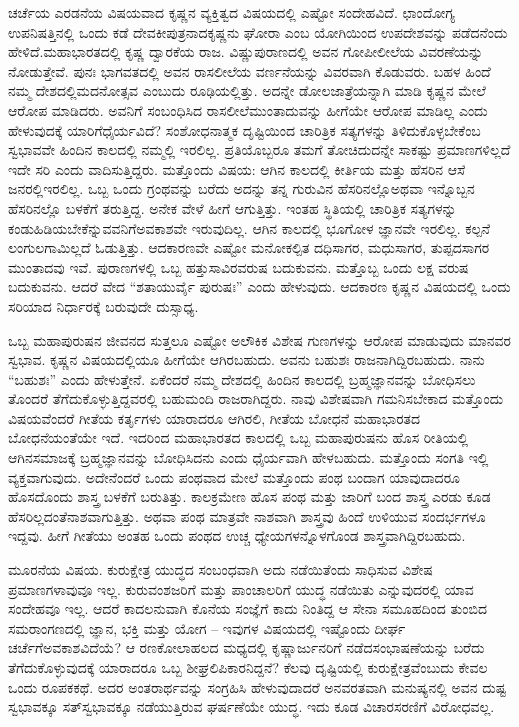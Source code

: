 ಚರ್ಚೆಯ ಎರಡನೆಯ ವಿಷಯವಾದ ಕೃಷ್ಣನ ವ್ಯಕ್ತಿತ್ವದ ವಿಷಯದಲ್ಲಿ ಎಷ್ಟೋ ಸಂದೇಹವಿದೆ. ಛಾಂದೋಗ್ಯ ಉಪನಿಷತ್ತಿನಲ್ಲಿ ಒಂದು ಕಡೆ ದೇವಕೀಪುತ್ರನಾದ\break ಕೃಷ್ಣನು ಘೋರಾ ಎಂಬ ಯೋಗಿಯಿಂದ ಉಪದೇಶವನ್ನು ಪಡೆದನೆಂದು ಹೇಳಿದೆ.\break ಮಹಾಭಾರತದಲ್ಲಿ ಕೃಷ್ಣ ದ್ವಾರಕೆಯ ರಾಜ. ವಿಷ್ಣುಪುರಾಣದಲ್ಲಿ ಅವನ ಗೋಪೀ\break ಲೀಲೆಯ ವಿವರಣೆಯನ್ನು ನೋಡುತ್ತೇವೆ. ಪುನಃ ಭಾಗವತದಲ್ಲಿ ಅವನ ರಾಸ\break ಲೀಲೆಯ ವರ್ಣನೆಯನ್ನು ವಿವರವಾಗಿ ಕೊಡುವರು. ಬಹಳ ಹಿಂದೆ ನಮ್ಮ ದೇಶದಲ್ಲಿ\break ಮದನೋತ್ಸವ ಎಂಬುದು ರೂಢಿಯಲ್ಲಿತ್ತು. ಅದನ್ನೇ ಡೋಲಜಾತ್ರೆಯನ್ನಾಗಿ ಮಾಡಿ ಕೃಷ್ಣನ ಮೇಲೆ ಆರೋಪ ಮಾಡಿದರು. ಅವನಿಗೆ ಸಂಬಂಧಿಸಿದ ರಾಸಲೀಲೆ\break ಮುಂತಾದುವನ್ನು ಹೀಗೆಯೇ ಆರೋಪ ಮಾಡಿಲ್ಲ ಎಂದು ಹೇಳುವುದಕ್ಕೆ ಯಾರಿಗೆ\break ಧೈರ್ಯವಿದೆ? ಸಂಶೋಧನಾತ್ಮಕ ದೃಷ್ಟಿಯಿಂದ ಚಾರಿತ್ರಿಕ ಸತ್ಯಗಳನ್ನು ತಿಳಿದುಕೊಳ್ಳ\-ಬೇಕೆಂಬ ಸ್ವಭಾವವೇ ಹಿಂದಿನ ಕಾಲದಲ್ಲಿ ನಮ್ಮಲ್ಲಿ ಇರಲಿಲ್ಲ. ಪ್ರತಿಯೊಬ್ಬರೂ ತಮಗೆ ತೋಚಿದುದನ್ನೇ ಸಾಕಷ್ಟು ಪ್ರಮಾಣಗಳಿಲ್ಲದೆ ಇದೇ ಸರಿ ಎಂದು ವಾದಿಸುತ್ತಿದ್ದರು. ಮತ್ತೊಂದು ವಿಷಯ: ಆಗಿನ ಕಾಲದಲ್ಲಿ ಕೀರ್ತಿಯ ಮತ್ತು ಹೆಸರಿನ ಆಸೆ ಜನರಲ್ಲಿ\break ಇರಲಿಲ್ಲ. ಒಬ್ಬ ಒಂದು ಗ್ರಂಥವನ್ನು ಬರೆದು ಅದನ್ನು ತನ್ನ ಗುರುವಿನ ಹೆಸರಿನಲ್ಲೊ\break ಅಥವಾ ಇನ್ನೊಬ್ಬನ ಹೆಸರಿನಲ್ಲೊ ಬಳಕೆಗೆ ತರುತ್ತಿದ್ದ. ಅನೇಕ ವೇಳೆ ಹೀಗೆ ಆಗುತ್ತಿತ್ತು. ಇಂತಹ ಸ್ಥಿತಿಯಲ್ಲಿ ಚಾರಿತ್ರಿಕ ಸತ್ಯಗಳನ್ನು ಕಂಡುಹಿಡಿಯಬೇಕೆನ್ನುವವನಿಗೆ\break ಅವಕಾಶವೇ ಇರುವುದಿಲ್ಲ. ಆಗಿನ ಕಾಲದಲ್ಲಿ ಭೂಗೋಳ ಜ್ಞಾನವೇ ಇರಲಿಲ್ಲ. ಕಲ್ಪನೆ ಲಂಗು\break ಲಗಾಮಿಲ್ಲದೆ ಓಡುತ್ತಿತ್ತು. ಆದಕಾರಣವೇ ಎಷ್ಟೋ ಮನೋಕಲ್ಪಿತ ದಧಿಸಾಗರ, ಮಧುಸಾಗರ, ತುಪ್ಪದಸಾಗರ ಮುಂತಾದವು ಇವೆ. ಪುರಾಣಗಳಲ್ಲಿ ಒಬ್ಬ ಹತ್ತುಸಾವಿರ\break ವರುಷ ಬದುಕುವನು. ಮತ್ತೊಬ್ಬ ಒಂದು ಲಕ್ಷ ವರುಷ ಬದುಕುವನು. ಆದರೆ ವೇದ “ಶತಾಯುರ್ವೈ ಪುರುಷಃ” ಎಂದು ಹೇಳುವುದು. ಆದಕಾರಣ ಕೃಷ್ಣನ ವಿಷಯದಲ್ಲಿ ಒಂದು ಸರಿಯಾದ ನಿರ್ಧಾರಕ್ಕೆ ಬರುವುದೇ ದುಸ್ಸಾಧ್ಯ.

ಒಬ್ಬ ಮಹಾಪುರುಷನ ಜೀವನದ ಸುತ್ತಲೂ ಎಷ್ಟೋ ಅಲೌಕಿಕ ವಿಶೇಷ ಗುಣಗಳನ್ನು ಆರೋಪ ಮಾಡುವುದು ಮಾನವರ ಸ್ವಭಾವ. ಕೃಷ್ಣನ ವಿಷಯದಲ್ಲಿಯೂ ಹೀಗೆಯೇ ಆಗಿರಬಹುದು. ಅವನು ಬಹುಶಃ ರಾಜನಾಗಿದ್ದಿರಬಹುದು. ನಾನು “ಬಹುಶಃ” ಎಂದು ಹೇಳುತ್ತೇನೆ. ಏಕೆಂದರೆ ನಮ್ಮ ದೇಶದಲ್ಲಿ ಹಿಂದಿನ ಕಾಲದಲ್ಲಿ ಬ್ರಹ್ಮಜ್ಞಾನವನ್ನು ಬೋಧಿಸಲು ತೊಂದರೆ ತೆಗೆದುಕೊಳ್ಳುತ್ತಿದ್ದವರಲ್ಲಿ ಬಹುಮಂದಿ ರಾಜರಾಗಿದ್ದರು. ನಾವು ವಿಶೇಷವಾಗಿ ಗಮನಿಸಬೇಕಾದ ಮತ್ತೊಂದು ವಿಷಯವೆಂದರೆ ಗೀತೆಯ ಕರ್ತೃಗಳು ಯಾರಾದರೂ ಆಗಿರಲಿ, ಗೀತೆಯ ಬೋಧನೆ ಮಹಾಭಾರತದ ಬೋಧನೆಯಂತೆಯೇ ಇದೆ. ಇದರಿಂದ ಮಹಾಭಾರತದ ಕಾಲದಲ್ಲಿ ಒಬ್ಬ ಮಹಾಪುರುಷನು ಹೊಸ ರೀತಿಯಲ್ಲಿ ಆಗಿನ\break ಸಮಾಜಕ್ಕೆ ಬ್ರಹ್ಮಜ್ಞಾನವನ್ನು ಬೋಧಿಸಿದನು ಎಂದು ಧೈರ್ಯವಾಗಿ ಹೇಳಬಹುದು. ಮತ್ತೊಂದು ಸಂಗತಿ ಇಲ್ಲಿ ವ್ಯಕ್ತವಾಗುವುದು. ಅದೇನೆಂದರೆ ಒಂದು ಪಂಥವಾದ ಮೇಲೆ ಮತ್ತೊಂದು ಪಂಥ ಬಂದಾಗ ಯಾವುದಾದರೂ ಹೊಸದೊಂದು ಶಾಸ್ತ್ರ ಬಳಕೆಗೆ ಬರುತಿತ್ತು. ಕಾಲಕ್ರಮೇಣ ಹೊಸ ಪಂಥ ಮತ್ತು ಜಾರಿಗೆ ಬಂದ ಶಾಸ್ತ್ರ ಎರಡು ಕೂಡ ಹೆಸರಿಲ್ಲದಂತೆ\break ನಾಶವಾಗುತ್ತಿತ್ತು. ಅಥವಾ ಪಂಥ ಮಾತ್ರವೇ ನಾಶವಾಗಿ ಶಾಸ್ತ್ರವು ಹಿಂದೆ ಉಳಿಯುವ ಸಂದರ್ಭಗಳೂ ಇದ್ದವು. ಹೀಗೆ ಗೀತೆಯು ಅಂತಹ ಒಂದು ಪಂಥದ ಉಚ್ಚ ಧ್ಯೇಯಗಳನ್ನೊಳಗೊಂಡ ಶಾಸ್ತ್ರವಾಗಿದ್ದಿರಬಹುದು.

ಮೂರನೆಯ ವಿಷಯ. ಕುರುಕ್ಷೇತ್ರ ಯುದ್ಧದ ಸಂಬಂಧವಾಗಿ ಅದು ನಡೆಯಿತೆಂದು ಸಾಧಿಸುವ ವಿಶೇಷ ಪ್ರಮಾಣಗಳಾವುವೂ ಇಲ್ಲ. ಕುರುವಂಶಜರಿಗೆ ಮತ್ತು ಪಾಂಚಾಲರಿಗೆ ಯುದ್ಧ ನಡೆಯಿತು ಎನ್ನುವುದರಲ್ಲಿ ಯಾವ ಸಂದೇಹವೂ ಇಲ್ಲ. ಆದರೆ ಕಾದಲನುವಾಗಿ ಕೊನೆಯ ಸಂಜ್ಞೆಗೆ ಕಾದು ನಿಂತಿದ್ದ ಆ ಸೇನಾ ಸಮೂಹದಿಂದ ತುಂಬಿದ ಸಮರಾಂಗಣದಲ್ಲಿ ಜ್ಞಾನ, ಭಕ್ತಿ ಮತ್ತು ಯೋಗ – ಇವುಗಳ ವಿಷಯದಲ್ಲಿ ಇಷ್ಟೊಂದು ದೀರ್ಘ ಚರ್ಚೆಗೆ\break ಅವಕಾಶವಿದೆಯೆ? ಆ ರಣಕೋಲಾಹಲದ ಮಧ್ಯದಲ್ಲಿ ಕೃಷ್ಣಾರ್ಜುನರಿಗೆ ನಡೆದ\break ಸಂಭಾಷಣೆಯನ್ನು ಬರೆದು ತೆಗೆದುಕೊಳ್ಳುವುದಕ್ಕೆ ಯಾರಾದರೂ ಒಬ್ಬ ಶೀಘ್ರಲಿಪಿಕಾರನಿದ್ದನೆ? ಕೆಲವು ದೃಷ್ಟಿಯಲ್ಲಿ ಕುರುಕ್ಷೇತ್ರವೆಂಬುದು ಕೇವಲ ಒಂದು ರೂಪಕಕಥೆ. ಅದರ ಅಂತರಾರ್ಥವನ್ನು ಸಂಗ್ರಹಿಸಿ ಹೇಳುವುದಾದರೆ ಅನವರತವಾಗಿ ಮನುಷ್ಯನಲ್ಲಿ ಅವನ ದುಷ್ಟ ಸ್ವಭಾವಕ್ಕೂ ಸತ್​ ಸ್ವಭಾವಕ್ಕೂ ನಡೆಯುತ್ತಿರುವ ಘರ್ಷಣೆಯೇ ಯುದ್ಧ. ಇದು ಕೂಡ ವಿಚಾರಸರಣಿಗೆ ವಿರೋಧವಲ್ಲ.

